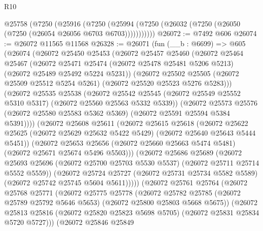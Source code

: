 \begin{lexlean}{R10}
\begin{coremodule}
{{{{{{{{{{{{{{{{{{{{{{{{{{{{{{{{{{{{{{{{{{{{{{{{{{{{{{{{{{{{{{{{{{{{{{{{{{{{{{{{{{{{    @25758
      (@7250
        (@25916
          (@7250 (@25994 (@7250 (@26032 (@7250 (@26050 (@7250 (@26054 @26056 @6703 @6703)))))))))))
@26072 := @7492 @606
@26074 := @26072 @11565 @11568
@26328 := @26071
    (fun (__b : @6699) =>
    @605
      (@26074
        (@26072
          @25450
          @25453
          (@26072
            @25457
            @25460
            (@26072
              @25464
              @25467
              (@26072
                @25471
                @25474
                (@26072 @25478 @25481 @5206 @5213)
                (@26072 @25489 @25492 @5224 @5231))
              (@26072
                @25502
                @25505
                (@26072 @25509 @25512 @5254 @5261)
                (@26072 @25520 @25523 @5276 @5283)))
            (@26072
              @25535
              @25538
              (@26072
                @25542
                @25545
                (@26072 @25549 @25552 @5310 @5317)
                (@26072 @25560 @25563 @5332 @5339))
              (@26072
                @25573
                @25576
                (@26072 @25580 @25583 @5362 @5369)
                (@26072 @25591 @25594 @5384 @5391))))
          (@26072
            @25608
            @25611
            (@26072
              @25615
              @25618
              (@26072
                @25622
                @25625
                (@26072 @25629 @25632 @5422 @5429)
                (@26072 @25640 @25643 @5444 @5451))
              (@26072
                @25653
                @25656
                (@26072 @25660 @25663 @5474 @5481)
                (@26072 @25671 @25674 @5496 @5503)))
            (@26072
              @25686
              @25689
              (@26072
                @25693
                @25696
                (@26072 @25700 @25703 @5530 @5537)
                (@26072 @25711 @25714 @5552 @5559))
              (@26072
                @25724
                @25727
                (@26072 @25731 @25734 @5582 @5589)
                (@26072 @25742 @25745 @5604 @5611)))))
        (@26072
          @25761
          @25764
          (@26072
            @25768
            @25771
            (@26072
              @25775
              @25778
              (@26072
                @25782
                @25785
                (@26072 @25789 @25792 @5646 @5653)
                (@26072 @25800 @25803 @5668 @5675))
              (@26072
                @25813
                @25816
                (@26072 @25820 @25823 @5698 @5705)
                (@26072 @25831 @25834 @5720 @5727)))
            (@26072
              @25846
              @25849
}}}}}}}}}}}}}}}}}}}}}}}}}}}}}}}}}}}}}}}}}}}}}}}}}}}}}}}}}}}}}}}}}}}}}}}}}}}}}}}}}}}}
\end{coremodule}
\end{lexlean}
